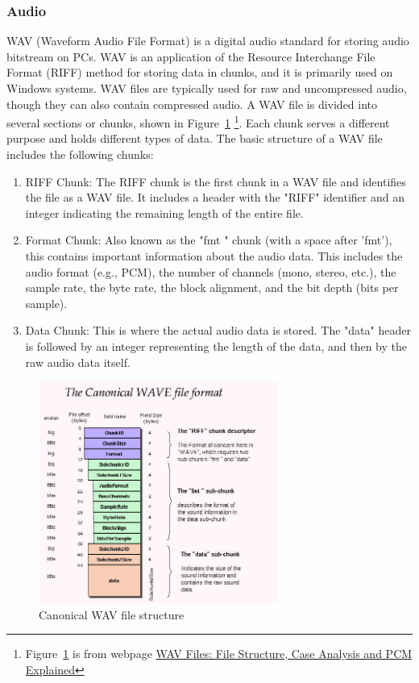 \documentclass{article}
\begin{document}
\subsubsection{Audio}
WAV (Waveform Audio File Format) is a digital audio standard for storing audio bitstream on PCs. 
WAV is an application of the Resource Interchange File Format (RIFF) method for storing data in chunks, and it is primarily used on Windows systems. 
WAV files are typically used for raw and uncompressed audio, though they can also contain compressed audio.
A WAV file is divided into several sections or chunks, shown in Figure~\ref{fig:canonical-wav-structure} \footnote{Figure~\ref{fig:canonical-wav-structure} is from webpage \href{https://www.videoproc.com/resource/wav-file.htm}{WAV Files: File Structure, Case Analysis and PCM Explained}}. Each chunk serves a different purpose and holds different types of data. The basic structure of a WAV file includes the following chunks:
\begin{enumerate}
    \item RIFF Chunk: The RIFF chunk is the first chunk in a WAV file and identifies the file as a WAV file. It includes a header with the "RIFF" identifier and an integer indicating the remaining length of the entire file.
    \item Format Chunk: Also known as the "fmt " chunk (with a space after 'fmt'), this contains important information about the audio data. This includes the audio format (e.g., PCM), the number of channels (mono, stereo, etc.), the sample rate, the byte rate, the block alignment, and the bit depth (bits per sample).
    \item Data Chunk: This is where the actual audio data is stored. The "data" header is followed by an integer representing the length of the data, and then by the raw audio data itself.
\end{enumerate}


\begin{figure}[htb]
    \centering
    \includegraphics[width=0.7\textwidth]{canonical-wav-file-structure.jpg}
    \caption{Canonical WAV file structure}
    \label{fig:canonical-wav-structure}
\end{figure}
\end{document}
